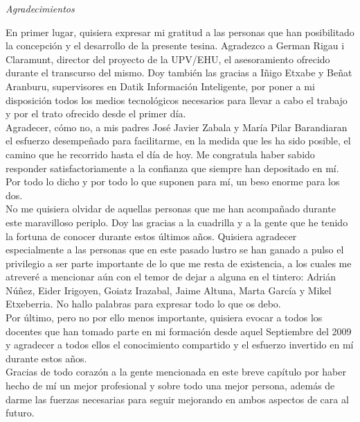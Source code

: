\begin{flushright}
	\Large\textit{Agradecimientos}
\end{flushright}

En primer lugar, quisiera expresar mi gratitud a las personas que han posibilitado la concepción y el desarrollo de la presente tesina. Agradezco a German Rigau i Claramunt, director del proyecto de la UPV/EHU, el asesoramiento ofrecido durante el transcurso del mismo. Doy también las gracias a Iñigo Etxabe y Beñat Aranburu, supervisores en Datik Información Inteligente, por poner a mi disposición todos los medios tecnológicos necesarios para llevar a cabo el trabajo y por el trato ofrecido desde el primer día.\\

Agradecer, cómo no, a mis padres José Javier Zabala y María Pilar Barandiaran el esfuerzo desempeñado para facilitarme, en la medida que les ha sido posible, el camino que he recorrido hasta el día de hoy. Me congratula haber sabido responder satisfactoriamente a la confianza que siempre han depositado en mí. Por todo lo dicho y por todo lo que suponen para mí, un beso enorme para los dos.\\

No me quisiera olvidar de aquellas personas que me han acompañado durante este maravilloso periplo. Doy las gracias a la cuadrilla y a la gente que he tenido la fortuna de conocer durante estos últimos años. Quisiera agradecer especialmente a las personas que en este pasado lustro se han ganado a pulso el privilegio a ser parte importante de lo que me resta de existencia, a los cuales me atreveré a mencionar aún con el temor de dejar a alguna en el tintero: Adrián Núñez, Eider Irigoyen, Goiatz Irazabal, Jaime Altuna, Marta García y Mikel Etxeberria. No hallo palabras para expresar todo lo que os debo.\\

Por último, pero no por ello menos importante, quisiera evocar a todos los docentes que han tomado parte en mi formación desde aquel Septiembre del 2009 y agradecer a todos ellos el conocimiento compartido y el esfuerzo invertido en mí durante estos años.\\

Gracias de todo corazón a la gente mencionada en este breve capítulo por haber hecho de mí un mejor profesional y sobre todo una mejor persona, además de darme las fuerzas necesarias para seguir mejorando en ambos aspectos de cara al futuro.\\

